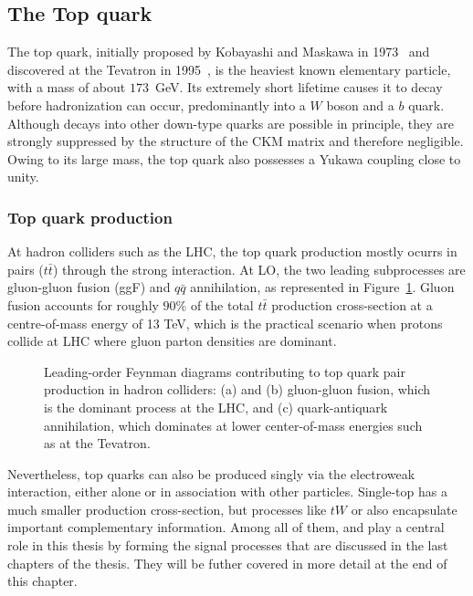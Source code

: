 \subsection{The Top quark}
\label{sec:top_quark}

The top quark, initially proposed by Kobayashi and Maskawa in 1973~\cite{10.1143/PTP.49.652} and discovered at the Tevatron in 1995~\cite{PhysRevLett.74.2626,PhysRevLett.74.2632}, is the heaviest known elementary particle, with a mass of about $173$~GeV. Its extremely short lifetime causes it to decay before hadronization can occur, predominantly into a $W$ boson and a $b$ quark. Although decays into other down-type quarks are possible in principle, they are strongly suppressed by the structure of the CKM matrix and therefore negligible. Owing to its large mass, the top quark also possesses a Yukawa coupling close to unity.

\subsubsection*{Top quark production}
\label{subsec:top_quark_prod}
At hadron colliders such as the LHC, the top quark production mostly ocurrs in pairs ($t\bar{t}$) through the strong interaction. At LO, the two leading subprocesses are gluon-gluon fusion (ggF) and $q\bar{q}$ annihilation, as represented in Figure~\ref{fig:tt-production}. Gluon fusion accounts for roughly $90\%$ of the total $t\bar{t}$ production cross-section at a centre-of-mass energy of 13 TeV, which is the practical scenario when protons collide at LHC where gluon parton densities are dominant. 
\begin{figure}[htbp]
    \centering
    \hfill
    \hfill
    \caption{Leading-order Feynman diagrams contributing to top quark pair production in hadron colliders: (a) and (b) gluon-gluon fusion, which is the dominant process at the LHC, and (c) quark-antiquark annihilation, which dominates at lower center-of-mass energies such as at the Tevatron.}
    \label{fig:tt-production}
\end{figure}


Nevertheless, top quarks can also be produced singly via the electroweak interaction, either alone or in association with other particles. Single-top has a much smaller production cross-section, but processes like $tW$ or \tH also encapsulate important complementary information.
Among all of them, \tH and \ttH play a central role in this thesis by forming the signal processes that are discussed in the last chapters of the thesis. They will be futher covered in more detail at the end of this chapter.

